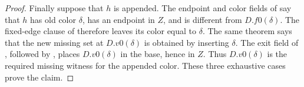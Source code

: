 \begin{proof}
Finally suppose that $h$ is appended.  The endpoint and color fields of
 say that $h$ has old color $\delta$, has
an endpoint in $Z$, and is different from $D.f0(\delta)$.  The fixed-edge
clause of  therefore leaves its
color equal to $\delta$.  The same theorem says that the new missing set
at $D.v0(\delta)$ is obtained by inserting $\delta$.  The exit field of
, followed by
, places $D.v0(\delta)$ in the
base, hence in $Z$.  Thus $D.v0(\delta)$ is the required missing witness
for the appended color.  These three exhaustive cases prove the claim.
\end{proof}
